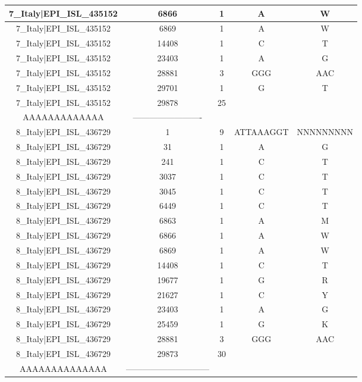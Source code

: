 \documentclass[a4paper,10pt]{article}
\begin{document}
\begin{longtable}{@{}ccccc@{}}
7\_Italy|EPI\_ISL\_435152 & 6866 & 1 & A & W \\* \midrule
7\_Italy|EPI\_ISL\_435152 & 6869 & 1 & A & W \\* \midrule
7\_Italy|EPI\_ISL\_435152 & 14408 & 1 & C & T \\* \midrule
7\_Italy|EPI\_ISL\_435152 & 23403 & 1 & A & G \\* \midrule
7\_Italy|EPI\_ISL\_435152 & 28881 & 3 & GGG & AAC \\* \midrule
7\_Italy|EPI\_ISL\_435152 & 29701 & 1 & G & T \\* \midrule
7\_Italy|EPI\_ISL\_435152 & 29878 & 25 & \begin{tabular}[c]{@{}c@{}}AAAAAAAAAAAA\\ AAAAAAAAAAAAA\end{tabular} & ------------------------- \\* \midrule
8\_Italy|EPI\_ISL\_436729 & 1 & 9 & ATTAAAGGT & NNNNNNNNN \\* \midrule
8\_Italy|EPI\_ISL\_436729 & 31 & 1 & A & G \\* \midrule
8\_Italy|EPI\_ISL\_436729 & 241 & 1 & C & T \\* \midrule
8\_Italy|EPI\_ISL\_436729 & 3037 & 1 & C & T \\* \midrule
8\_Italy|EPI\_ISL\_436729 & 3045 & 1 & C & T \\* \midrule
8\_Italy|EPI\_ISL\_436729 & 6449 & 1 & C & T \\* \midrule
8\_Italy|EPI\_ISL\_436729 & 6863 & 1 & A & M \\* \midrule
8\_Italy|EPI\_ISL\_436729 & 6866 & 1 & A & W \\* \midrule
8\_Italy|EPI\_ISL\_436729 & 6869 & 1 & A & W \\* \midrule
8\_Italy|EPI\_ISL\_436729 & 14408 & 1 & C & T \\* \midrule
8\_Italy|EPI\_ISL\_436729 & 19677 & 1 & G & R \\* \midrule
8\_Italy|EPI\_ISL\_436729 & 21627 & 1 & C & Y \\* \midrule
8\_Italy|EPI\_ISL\_436729 & 23403 & 1 & A & G \\* \midrule
8\_Italy|EPI\_ISL\_436729 & 25459 & 1 & G & K \\* \midrule
8\_Italy|EPI\_ISL\_436729 & 28881 & 3 & GGG & AAC \\* \midrule
8\_Italy|EPI\_ISL\_436729 & 29873 & 30 & \begin{tabular}[c]{@{}c@{}}AAAAAAAAAAAAAAAA\\ AAAAAAAAAAAAAA\end{tabular} & ------------------------------ \\* \bottomrule
\end{longtable}
\end{document}

